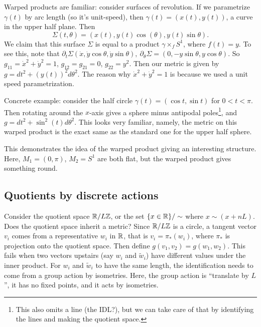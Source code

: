 Warped products are familiar: consider surfaces of revolution. If we parametrize $\gamma (t)$ by arc length (so it's unit-speed), then $\gamma (t)=(x(t),y(t))$, a curve in the upper half plane. Then \[
    \Sigma(t,\theta)=(x(t),y(t)\cos (\theta), y(t) \sin \theta).
\] We claim that this surface $\Sigma$ is equal to a product $\gamma \times _f S^1 $, where $f(t)=y$. To see this, note that $\partial _t\Sigma(\dot x,\dot y \cos \theta, \dot y \sin \theta),\ \partial _{\theta}\Sigma=(0,-y \sin \theta,y \cos \theta)$. So $g_{11}=\dot x^2+\dot y^2=1$, $g_{12}=g_{21}=0$, $g_{22}=y^2$. Then our metric is given by $g=dt^2+(y(t))^2d\theta^2$. The reason why $\dot x^2+\dot y^2=1$ is because we used a unit speed parametrization.
\begin{example}
    Concrete example: consider the half circle $\gamma (t)=(\cos t, \sin t)$ for $0<t<\pi$. Then rotating around the $x$-axis gives a sphere minus antipodal poles\footnote{This also omits a line (the IDL?), but we can take care of that by identifying the lines and making the quotient space.}, and $g=dt ^2+\sin ^2(t)d\theta ^2$. This looks very familiar, namely, the metric on this warped product is the exact same as the standard one for the upper half sphere. 

    This demonstrates the idea of the warped product giving an interesting structure. Here, $M_1=(0,\pi)$, $M_2=S^1 $ are both flat, but the warped product gives something round.
\end{example}

\subsection{Quotients by discrete actions}
Consider the quotient space $\mathbb{R} / L\mathbb{Z}$, or the set $\{x\in \mathbb{R}\} / \sim$ where $x \sim (x+nL)$. Does the quotient space inherit a metric? Since $\mathbb{R}/ L\mathbb{Z}$ is a circle, a tangent vector $v_i$ comes from a representative $w_i $ in $\mathbb{R}$, that is $v_i =\pi_*(w_i )$, where $\pi_*$ is projection onto the quotient space. Then define $g(v_1,v_2)=g(w_1,w_2)$. This fails when two vectors upstairs (say $w_i $ and $\widetilde w_i $) have different values under the inner product. For $w_i $ and $\widetilde w_i $ to have the same length, the identification needs to come from a group action by isometries. Here, the group action is ``translate by $L$'', it has no fixed points, and it acts by isometries.

